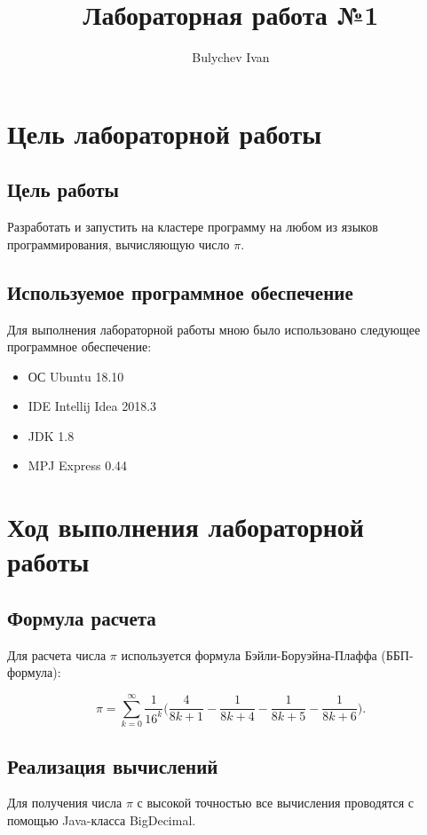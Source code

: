 \documentclass[titlepage,oneside,final,14pt]{extarticle} %
\author{Bulychev Ivan}
\title{Лабораторная работа №1}
\begin{document}
		

\setcounter{page}{2}
\setlength{\parindent}{1.25cm} %
\section{Цель лабораторной работы}

\subsection{Цель работы}

Разработать и запустить на кластере программу на любом из языков программирования, вычисляющую число $\pi$.

\subsection{Используемое программное обеспечение}

Для выполнения лабораторной работы мною было использовано следующее программное обеспечение:
\begin{itemize}
	\item ОС Ubuntu 18.10
	\item IDE Intellij Idea 2018.3
	\item JDK 1.8
	\item MPJ Express 0.44
\end{itemize}

\section{Ход выполнения лабораторной работы}

\subsection{Формула расчета}

Для расчета числа $\pi$ используется формула Бэйли-Боруэйна-Плаффа (ББП-формула):

\begin{equation}\label{bbp}
    \pi = \sum\limits_{k=0}^{\infty} \frac{1}{16^k} \Bigg(\frac{4}{8k+1} - \frac{1}{8k+4} - \frac{1}{8k+5} - \frac{1}{8k+6} \Bigg).
\end{equation}

\subsection{Реализация вычислений}

Для получения числа $\pi$ с высокой точностью все вычисления проводятся с помощью Java-класса BigDecimal.
\end{document}
